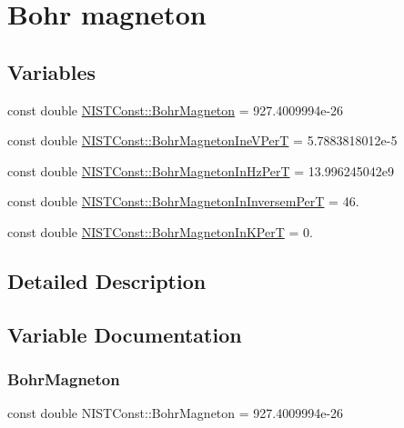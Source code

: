 \hypertarget{group___bohr_magneton}{}\section{Bohr magneton}
\label{group___bohr_magneton}
\subsection*{Variables}
\begin{DoxyCompactItemize}
\item 
const double \hyperlink{group___bohr_magneton_gaace59be8951a23257cedcbef8f320c66}{N\+I\+S\+T\+Const\+::\+Bohr\+Magneton} = 927.\+4009994e-\/26
\item 
const double \hyperlink{group___bohr_magneton_ga8b97d10b13a2c5de4f0d268370bc3c50}{N\+I\+S\+T\+Const\+::\+Bohr\+Magneton\+Ine\+V\+PerT} = 5.\+7883818012e-\/5
\item 
const double \hyperlink{group___bohr_magneton_ga0c3cc268d0e1abc4703ea8f2c11ccab8}{N\+I\+S\+T\+Const\+::\+Bohr\+Magneton\+In\+Hz\+PerT} = 13.\+996245042e9
\item 
const double \hyperlink{group___bohr_magneton_ga934ba6e90d5c57948d11224640830e86}{N\+I\+S\+T\+Const\+::\+Bohr\+Magneton\+In\+Inversem\+PerT} = 46.
\item 
const double \hyperlink{group___bohr_magneton_ga4fcb81eff2823748ae5fced898ecc0ec}{N\+I\+S\+T\+Const\+::\+Bohr\+Magneton\+In\+K\+PerT} = 0.
\end{DoxyCompactItemize}


\subsection{Detailed Description}


\subsection{Variable Documentation}
\mbox{\label{group___bohr_magneton_gaace59be8951a23257cedcbef8f320c66}} 
\subsubsection{\texorpdfstring{Bohr\+Magneton}{BohrMagneton}}
{\footnotesize\ttfamily const double N\+I\+S\+T\+Const\+::\+Bohr\+Magneton = 927.\+4009994e-\/26}

